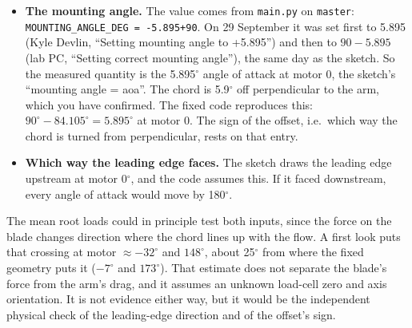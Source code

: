 \documentclass[11pt]{article}
\newcommand{\code}[1]{\texttt{#1}}
\begin{document}
\begin{itemize}
  \item \textbf{The mounting angle.} The value comes from
        \code{main.py} on \code{master}: \code{MOUNTING\_ANGLE\_DEG =
        -5.895+90}. On 29 September it was set first to 5.895 (Kyle Devlin,
        ``Setting mounting angle to +5.895'') and then to $90 - 5.895$ (lab
        PC, ``Setting correct mounting angle''), the same day as the sketch.
        So the measured quantity is the 5.895$^\circ$ angle of attack at
        motor 0, the sketch's ``mounting angle = aoa''. The chord is
        5.9$^\circ$ off perpendicular to the arm, which you have confirmed.
        The fixed code reproduces this: $90^\circ - 84.105^\circ =
        5.895^\circ$ at motor 0. The sign of the offset, i.e.\ which way
        the chord is turned from perpendicular, rests on that entry.
  \item \textbf{Which way the leading edge faces.} The sketch draws the
        leading edge upstream at motor 0$^\circ$, and the code assumes this.
        If it faced downstream, every angle of attack would move by
        180$^\circ$.
\end{itemize}

The mean root loads could in principle test both inputs, since the force on
the blade changes direction where the chord lines up with the flow. A first
look puts that crossing at motor $\approx -32^\circ$ and $148^\circ$, about
25$^\circ$ from where the fixed geometry puts it ($-7^\circ$ and
$173^\circ$). That estimate does not separate the blade's force from the
arm's drag, and it assumes an unknown load-cell zero and axis orientation. It
is not evidence either way, but it would be the independent physical check
of the leading-edge direction and of the offset's sign.
\end{document}
